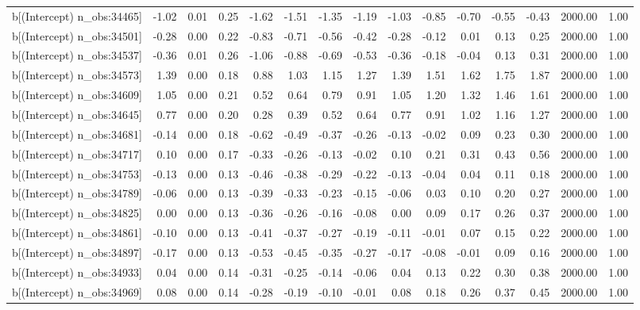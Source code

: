 \begin{table}[ht]
\begin{tabular}{rrrrrrrrrrrrrrr}
  b[(Intercept) n\_obs:34465] & -1.02 & 0.01 & 0.25 & -1.62 & -1.51 & -1.35 & -1.19 & -1.03 & -0.85 & -0.70 & -0.55 & -0.43 & 2000.00 & 1.00 \\ 
  b[(Intercept) n\_obs:34501] & -0.28 & 0.00 & 0.22 & -0.83 & -0.71 & -0.56 & -0.42 & -0.28 & -0.12 & 0.01 & 0.13 & 0.25 & 2000.00 & 1.00 \\ 
  b[(Intercept) n\_obs:34537] & -0.36 & 0.01 & 0.26 & -1.06 & -0.88 & -0.69 & -0.53 & -0.36 & -0.18 & -0.04 & 0.13 & 0.31 & 2000.00 & 1.00 \\ 
  b[(Intercept) n\_obs:34573] & 1.39 & 0.00 & 0.18 & 0.88 & 1.03 & 1.15 & 1.27 & 1.39 & 1.51 & 1.62 & 1.75 & 1.87 & 2000.00 & 1.00 \\ 
  b[(Intercept) n\_obs:34609] & 1.05 & 0.00 & 0.21 & 0.52 & 0.64 & 0.79 & 0.91 & 1.05 & 1.20 & 1.32 & 1.46 & 1.61 & 2000.00 & 1.00 \\ 
  b[(Intercept) n\_obs:34645] & 0.77 & 0.00 & 0.20 & 0.28 & 0.39 & 0.52 & 0.64 & 0.77 & 0.91 & 1.02 & 1.16 & 1.27 & 2000.00 & 1.00 \\ 
  b[(Intercept) n\_obs:34681] & -0.14 & 0.00 & 0.18 & -0.62 & -0.49 & -0.37 & -0.26 & -0.13 & -0.02 & 0.09 & 0.23 & 0.30 & 2000.00 & 1.00 \\ 
  b[(Intercept) n\_obs:34717] & 0.10 & 0.00 & 0.17 & -0.33 & -0.26 & -0.13 & -0.02 & 0.10 & 0.21 & 0.31 & 0.43 & 0.56 & 2000.00 & 1.00 \\ 
  b[(Intercept) n\_obs:34753] & -0.13 & 0.00 & 0.13 & -0.46 & -0.38 & -0.29 & -0.22 & -0.13 & -0.04 & 0.04 & 0.11 & 0.18 & 2000.00 & 1.00 \\ 
  b[(Intercept) n\_obs:34789] & -0.06 & 0.00 & 0.13 & -0.39 & -0.33 & -0.23 & -0.15 & -0.06 & 0.03 & 0.10 & 0.20 & 0.27 & 2000.00 & 1.00 \\ 
  b[(Intercept) n\_obs:34825] & 0.00 & 0.00 & 0.13 & -0.36 & -0.26 & -0.16 & -0.08 & 0.00 & 0.09 & 0.17 & 0.26 & 0.37 & 2000.00 & 1.00 \\ 
  b[(Intercept) n\_obs:34861] & -0.10 & 0.00 & 0.13 & -0.41 & -0.37 & -0.27 & -0.19 & -0.11 & -0.01 & 0.07 & 0.15 & 0.22 & 2000.00 & 1.00 \\ 
  b[(Intercept) n\_obs:34897] & -0.17 & 0.00 & 0.13 & -0.53 & -0.45 & -0.35 & -0.27 & -0.17 & -0.08 & -0.01 & 0.09 & 0.16 & 2000.00 & 1.00 \\ 
  b[(Intercept) n\_obs:34933] & 0.04 & 0.00 & 0.14 & -0.31 & -0.25 & -0.14 & -0.06 & 0.04 & 0.13 & 0.22 & 0.30 & 0.38 & 2000.00 & 1.00 \\ 
  b[(Intercept) n\_obs:34969] & 0.08 & 0.00 & 0.14 & -0.28 & -0.19 & -0.10 & -0.01 & 0.08 & 0.18 & 0.26 & 0.37 & 0.45 & 2000.00 & 1.00 \\ 

\end{tabular}
\end{table}
